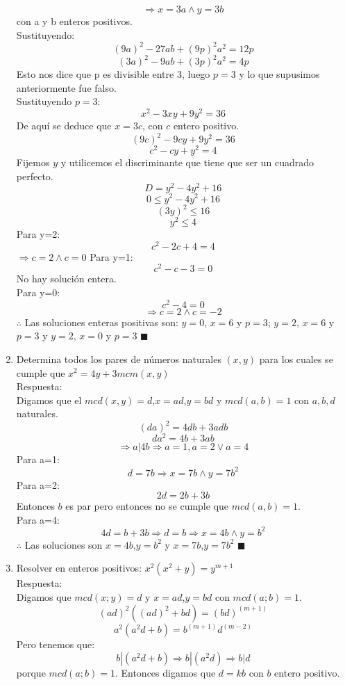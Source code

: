 \documentclass{book}
\begin{document}
\begin{enumerate}
        $$\Rightarrow x=3a \wedge y=3b$$
        con a y b enteros positivos. \\
        Sustituyendo:
        $${(9a)}^2-27ab+{(9p)}^2 a^2=12p$$
        $${(3a)}^2-9ab+{(3p)}^2 a^2=4p$$
        Esto nos dice que p es divisible entre 3, luego $p=3$ y lo que supusimos anteriormente fue falso.\\
        Sustituyendo $p=3$:
        $$x^2-3xy+9y^2=36$$
        De aquí se deduce que $x=3c$, con $c$ entero positivo.
        $${(9c)}^2-9cy+9y^2=36$$
        $$c^2-cy+y^2=4$$
        Fijemos $y$ y utilicemos el discriminante que tiene que ser un cuadrado perfecto.
        $$D=y^2-4y^2+16$$
        $$0\leq y^2-4y^2+16$$
        $${(3y)}^2\leq 16$$
        $$y^2\leq 4$$
        Para y=2:
        $$c^2-2c+4=4$$
        $\Rightarrow c=2 \wedge c=0$
        Para y=1:
        $$c^2-c-3=0$$
        No hay solución entera.\\
        Para y=0:
        $$c^2-4=0$$
        $$\Rightarrow c=2 \wedge c=-2$$
        $\therefore$ Las soluciones enteras positivas son: $y=0$, $x=6$ y $p=3$; $y=2$, $x=6$ y $p=3$ y $y=2$, $x=0$ y $p=3$ $\blacksquare$\\
        \item Determina todos los pares de números naturales $(x,y)$ para los cuales se cumple que $x^2=4y+3mcm(x,y)$\\
        Respuesta:\\
        Digamos que el $mcd(x,y)=d$,$x=ad$,$y=bd$ y $mcd(a,b)=1$ con $a,b,d$ naturales.
        $${(da)}^2  = 4db +3adb$$
        $$da^2  = 4b +3ab$$
        $$\Rightarrow a|4b \Rightarrow a=1,a=2 \vee a=4$$
        Para a=1:
        $$d = 7b\Rightarrow x=7b \wedge y=7b^2$$
        Para a=2:
        $$2d = 2b +3b$$
        Entonces $b$ es par pero entonces no se cumple que $mcd(a,b)=1$.\\
        Para a=4:
        $$4d =b+3b\Rightarrow d=b\Rightarrow x=4b \wedge y=b^2$$
        $\therefore$ Las soluciones son $x=4b$,$y=b^2$ y $x=7b$,$y=7b^2$ $\blacksquare$\\
        \item Resolver en enteros positivos: $x^2(x^2+y)=y^{m+1}$\\
        Respuesta:\\
        Digamos que $mcd(x;y)=d$ y $x=ad$,$y=bd$ con $mcd(a;b)=1$.
        $${(ad)}^2 ({(ad)}^2+bd)={(bd)}^{(m+1)}$$
        $$a^2 (a^2 d+b)=b^{(m+1)} d^{(m-2)}$$
        Pero tenemos que:
        $$ b|(a^2 d+b )  \Rightarrow  b|(a^2 d) \Rightarrow b|d$$
        porque $mcd(a;b)=1$.
        Entonces digamos que $d=kb$ con $b$ entero positivo.

\end{enumerate}
\end{document}

